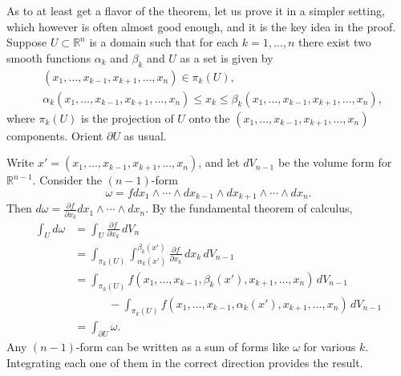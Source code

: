 \documentclass[12pt,openany]{book}
\newcommand{\R}{{\mathbb{R}}}
\theoremstyle{plain}
\theoremstyle{remark}
\theoremstyle{definition}
\theoremstyle{exercise}
\theoremstyle{example}
\begin{document}
As to at least get a flavor of the theorem, let us prove it in a simpler
setting, which however is often almost good enough, and it is the key idea
in the proof.
Suppose $U \subset \R^n$ is a domain such that for each $k=1,\ldots,n$
there exist two smooth functions $\alpha_k$ and $\beta_k$ and $U$
as a set is given by
\begin{equation*}
\begin{aligned}
& (x_1,\ldots,x_{k-1},x_{k+1},\ldots,x_n) \in \pi_k(U) ,
\\
& \alpha_k(x_1,\ldots,x_{k-1},x_{k+1},\ldots,x_n)
\leq x_k \leq
\beta_k(x_1,\ldots,x_{k-1},x_{k+1},\ldots,x_n) ,
\end{aligned}
\end{equation*}
where $\pi_k(U)$ is the projection of $U$ onto the
$(x_1,\ldots,x_{k-1},x_{k+1},\ldots,x_n)$ components.
Orient $\partial U$ as usual.

Write $x' = (x_1,\ldots,x_{k-1},x_{k+1},\ldots,x_n)$, and let $dV_{n-1}$ be the
volume form for $\R^{n-1}$.
Consider the $(n-1)$-form
\begin{equation*}
\omega = f
dx_1 \wedge \cdots \wedge dx_{k-1} \wedge dx_{k+1} \wedge \cdots \wedge dx_n
.
\end{equation*}
Then $d\omega = \frac{\partial f}{\partial x_k} dx_1 \wedge \cdots \wedge
dx_n$.
By the fundamental theorem of
calculus,
\begin{equation*}
\begin{split}
\int_U d\omega &=
\int_U \frac{\partial f}{\partial x_k} \, dV_n
\\
& =
\int_{\pi_k(U)}
\int_{\alpha_k(x')}^{\beta_k(x')}
\frac{\partial f}{\partial x_k} \, dx_k \, dV_{n-1}
\\
& =
\int_{\pi_k(U)}
f(x_1,\ldots,x_{k-1}, \beta_k(x'), x_{k+1}, \ldots, x_n)
\,dV_{n-1}
\\
& \phantom{=xxx}
-
\int_{\pi_k(U)}
f(x_1,\ldots,x_{k-1}, \alpha_k(x'), x_{k+1}, \ldots, x_n)
\,dV_{n-1}
\\
& =
\int_{\partial U} \omega .
\end{split}
\end{equation*}
Any $(n-1)$-form can be written as a sum of forms like $\omega$ for various
$k$.  Integrating each one of them in the correct direction provides the
result.

\end{document}
